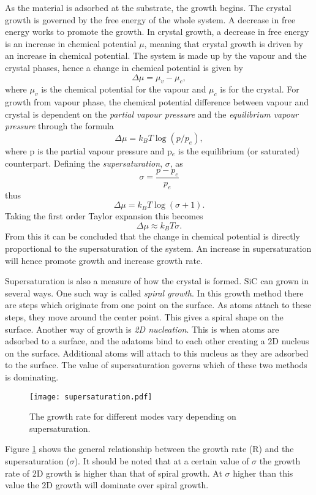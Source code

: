  As the material is adsorbed at the substrate, the growth begins. The crystal growth is governed by the free energy of the whole system. A decrease in free energy works to promote the growth. In crystal growth, a decrease in free energy is an increase in chemical potential $\mu$, meaning that crystal growth is driven by an increase in chemical potential. The system is made up by the vapour and the crystal phases, hence a change in chemical potential is given by 
 \[\Delta \mu = \mu_v -\mu_c,\]
where $\mu_v$ is the chemical potential for the vapour and $\mu_c$ is for the crystal. For growth from vapour phase, the chemical potential difference between vapour and crystal is dependent on the \emph{partial vapour pressure} and the \emph{equilibrium vapour pressure} through the formula
 \[\Delta \mu = k_BT\log(p/p_e),\]
where p is the partial vapour pressure and p$_e$ is the equilibrium (or saturated) counterpart. Defining the \emph{supersaturation}, $\sigma$, as
\[\sigma = \frac{p-p_e}{p_e}\]
thus
 \[\Delta \mu = k_BT\log(\sigma+1).\]
Taking the first order Taylor expansion this becomes
\[\Delta \mu \approx k_BT\sigma.\]
 From this it can be concluded that the change in chemical potential is directly proportional to the supersaturation of the system. An increase in supersaturation will hence promote growth and increase growth rate. 
 
 Supersaturation is also a measure of how the crystal is formed. SiC can grown in several ways. One such way is called \emph{spiral growth}. In this growth method there are steps which originate from one point on the surface. As atoms attach to these steps, they move around the center point. This gives a spiral shape on the surface. Another way of growth is \emph{2D nucleation}. This is when atoms are adsorbed to a surface, and the adatoms bind to each other creating a 2D nucleus on the surface. Additional atoms will attach to this nucleus as they are adsorbed to the surface. The value of supersaturation governs which of these two methods is dominating. 
 
\begin{figure}[h]
\begin{center}
\texttt{[image: supersaturation.pdf]}
\caption{The growth rate for different modes vary depending on supersaturation. 
\label{fig:supersaturation}}
\end{center}
\end{figure}
 
 Figure \ref{fig:supersaturation} shows the general relationship between the growth rate (R) and the supersaturation ($\sigma$). It should be noted that at a certain value of $\sigma$ the growth rate of 2D growth is higher than that of spiral growth. At $\sigma$ higher than this value the 2D growth will dominate over spiral growth. 
 
